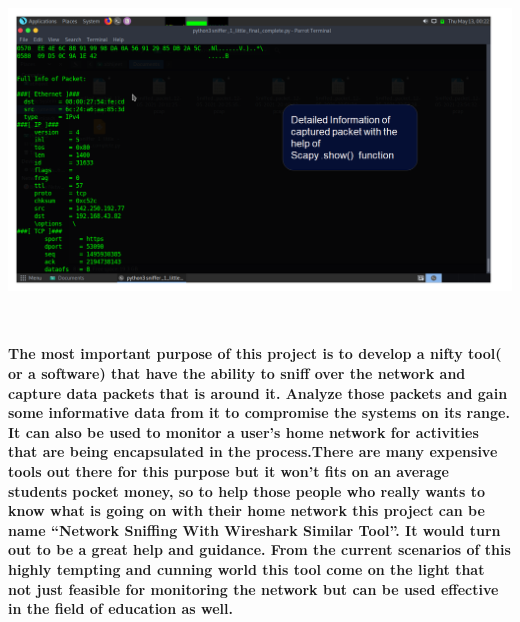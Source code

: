 \documentclass[12pt, a4paper]{report}
\begin{document}
\includegraphics[width=6.85666in,height=3.55507in]{Screenshot (16).png}

\pagebreak

    


\paragraph{The most important purpose of this project is to develop a nifty tool(
or a software) that have the ability to sniff over the network and
capture data packets that is around it. Analyze those packets and gain
some informative data from it to compromise the systems on its range. It
can also be used to monitor a user's home network for activities that
are being encapsulated in the process.There are many expensive tools out
there for this purpose but it won't fits on an average students pocket
money, so to help those people who really wants to know what is going on
with their home network this project can be name ``Network Sniffing With
Wireshark Similar Tool''. It would turn out to be a great help and
guidance. From the current scenarios of this highly tempting and cunning
world this tool come on the light that not just feasible for monitoring
the network but can be used effective in the field of education as well.}
\end{document}
